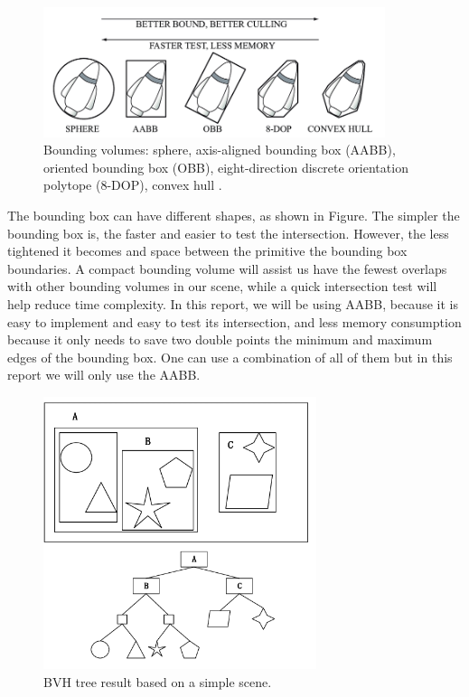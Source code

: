 \documentclass[11pt,a4paper]{article}
\begin{document}
\begin{figure}[h]	
     \centering
     \captionsetup{justification=centering,margin=2cm}
     \includegraphics[width=10cm]{images/bvs.png}
     \caption{Bounding volumes: sphere, axis-aligned bounding box (AABB), oriented bounding box (OBB), eight-direction discrete orientation polytope (8-DOP), convex hull . \protect\cite{Ericson2004}}
        \label{fig:dice}
\end{figure}

The bounding box can have different shapes, as shown in Figure. The simpler the bounding box is, the faster and easier to test the intersection. However, the less tightened it becomes and space between the primitive the bounding box boundaries. A compact bounding volume will assist us have the fewest overlaps with other bounding volumes in our scene, while a quick intersection test will help reduce time complexity. In this report, we will be using AABB, because it is easy to implement and easy to test its intersection, and less memory consumption because it only needs to save two double points the minimum and maximum edges of the bounding box. One can use a combination of all of them but in this report we will only use the AABB. 



\begin{figure}[h]	
     \centering
     \captionsetup{justification=centering,margin=2cm}
     \includegraphics[width=8cm]{images/bvh_tree.png}
     \caption{BVH tree result based on a simple scene. \protect\cite{Ericson2004} }
        \label{fig:dice}
\end{figure}
\end{document}
